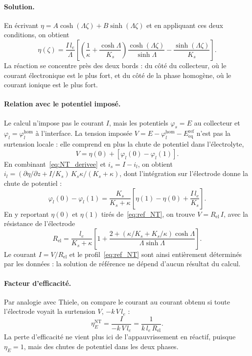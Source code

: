 \paragraph{Solution.} En écrivant $\eta = A\cosh(\Lambda\zeta) + B\sinh(\Lambda\zeta)$
et en appliquant ces deux conditions, on obtient
\begin{equation}
\eta(\zeta) = \frac{I\,l_e}{\Lambda}
\left[
\left(\frac{1}{\kappa} + \frac{\cosh\Lambda}{K_s}\right)
\frac{\cosh(\Lambda\zeta)}{\sinh\Lambda}
- \frac{\sinh(\Lambda\zeta)}{K_s}
\right].
\label{eq:ref_NT}
\end{equation}
La réaction se concentre près des deux bords : du côté du collecteur, où le
courant électronique est le plus fort, et du côté de la phase homogène, où le
courant ionique est le plus fort.

\paragraph{Relation avec le potentiel imposé.} Le calcul n'impose pas le
courant $I$, mais les potentiels $\varphi_s = E$ au collecteur et
$\varphi_l = \varphi_l^{\mathrm{hom}}$ à l'interface. La tension imposée
$V = E - \varphi_l^{\mathrm{hom}} - E_{\mathrm{eq}}^{\mathrm{ref}}$ n'est pas
la surtension locale : elle comprend en plus la chute de potentiel dans
l'électrolyte,
\begin{equation}
V = \eta(0) + \left[\varphi_l(0) - \varphi_l(1)\right] .
\end{equation}
En combinant~\eqref{eq:NT_derivee} et $i_s = I - i_l$, on obtient
$i_l = (\partial\eta/\partial z + I/K_s)\,K_s\kappa/(K_s + \kappa)$, dont
l'intégration sur l'électrode donne la chute de potentiel :
\begin{equation}
\varphi_l(0) - \varphi_l(1)
= \frac{K_s}{K_s + \kappa}\left[\eta(1) - \eta(0) + \frac{I\,l_e}{K_s}\right] .
\end{equation}
En y reportant $\eta(0)$ et $\eta(1)$ tirés de~\eqref{eq:ref_NT}, on trouve
$V = R_{\mathrm{el}}\,I$, avec la résistance de l'électrode
\begin{equation}
R_{\mathrm{el}} = \frac{l_e}{K_s + \kappa}
\left[1 + \frac{2 + \left(\kappa/K_s + K_s/\kappa\right)\cosh\Lambda}{\Lambda\sinh\Lambda}\right] .
\label{eq:NT_R}
\end{equation}
Le courant $I = V/R_{\mathrm{el}}$ et le profil~\eqref{eq:ref_NT} sont ainsi
entièrement déterminés par les données : la solution de référence ne dépend
d'aucun résultat du calcul.

\paragraph{Facteur d'efficacité.} Par analogie avec Thiele, on compare le
courant au courant obtenu si toute l'électrode voyait la surtension $V$,
$-k\,V\,l_e$ :
\begin{equation}
\eta_E^{\mathrm{NT}} = \frac{I}{-k\,V\,l_e} = \frac{1}{k\,l_e\,R_{\mathrm{el}}} .
\end{equation}
La perte d'efficacité ne vient plus ici de l'appauvrissement en réactif,
puisque $\eta_E = 1$, mais des chutes de potentiel dans les deux phases.

